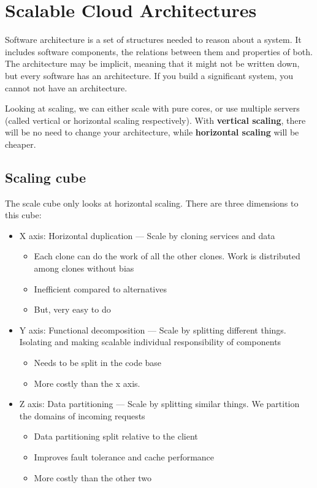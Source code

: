 \documentclass[11pt,a4paper,titlepage,dvipsnames,cmyk]{scrartcl}
\begin{document}
\section{Scalable Cloud Architectures}
Software architecture is a set of structures needed to reason about a system. It includes software components, the relations between them and properties of both. The architecture may be implicit, meaning that it might not be written down, but every software has an architecture. If you build a significant system, you cannot not have an architecture.

Looking at scaling, we can either scale with pure cores, or use multiple servers (called vertical or horizontal scaling respectively). With \textbf{vertical scaling}, there will be no need to change your architecture, while \textbf{horizontal scaling} will be cheaper.

\subsection{Scaling cube}
The scale cube only looks at horizontal scaling. There are three dimensions to this cube:
\begin{itemize}
    \item X axis: Horizontal duplication --- Scale by cloning services and data
    \begin{itemize}
        \item Each clone can do the work of all the other clones. Work is distributed among clones without bias
        \item Inefficient compared to alternatives
        \item But, very easy to do
    \end{itemize}
    \item Y axis: Functional decomposition --- Scale by splitting different things. Isolating and making scalable individual responsibility of components
    \begin{itemize}
        \item Needs to be split in the code base
        \item More costly than the x axis.
    \end{itemize}
    \item Z axis: Data partitioning --- Scale by splitting similar things. We partition the domains of incoming requests
    \begin{itemize}
        \item Data partitioning split relative to the client
        \item Improves fault tolerance and cache  performance
        \item More costly than the other two
    \end{itemize}
\end{itemize}
\end{document}
